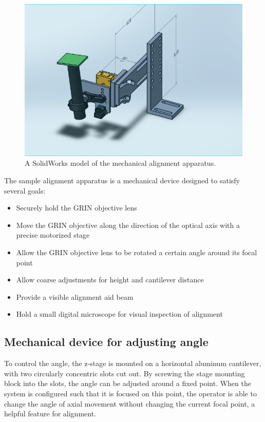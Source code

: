\begin{figure}[h!]
\centering
\includegraphics[width=1.0\textwidth]{Images/Alignment/new_d_2.png}
\caption{A SolidWorks model of the mechanical alignment apparatus.}
\end{figure}

The sample alignment apparatus is a mechanical device designed to satisfy several goals:

\begin{itemize}
	\item Securely hold the GRIN objective lens
	\item Move the GRIN objective along the direction of the optical axis with a precise motorized stage
	\item Allow the GRIN objective lens to be rotated a certain angle around its focal point
	\item Allow coarse adjustments for height and cantilever distance
	\item Provide a visible alignment aid beam
	\item Hold a small digital microscope for visual inspection of alignment
\end{itemize}

\subsection{Mechanical device for adjusting angle}

To control the angle, the z-stage is mounted on a horizontal aluminum cantilever, with two circularly concentric slots cut out. By screwing the stage mounting block into the slots, the angle can be adjusted around a fixed point. When the system is configured such that it is focused on this point, the operator is able to change the angle of axial movement without changing the current focal point, a helpful feature for alignment.

